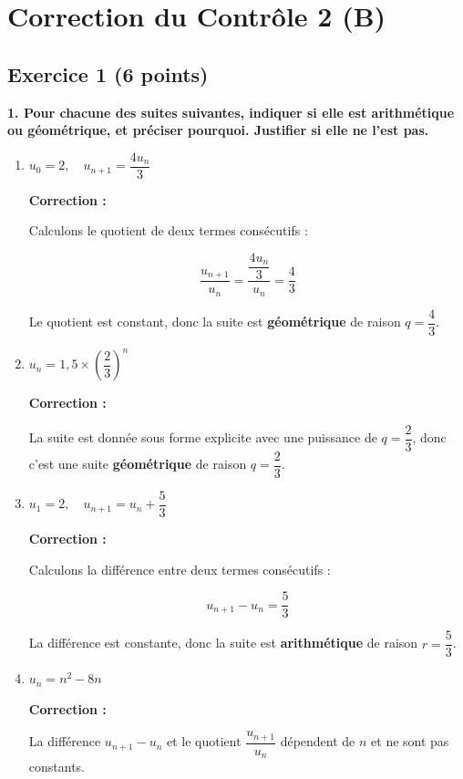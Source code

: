 \documentclass{article}
\begin{document}
\section*{Correction du Contrôle 2 (B)}

\subsection*{Exercice 1 (6 points)}

\textbf{1. Pour chacune des suites suivantes, indiquer si elle est arithmétique ou géométrique, et préciser pourquoi. Justifier si elle ne l'est pas.}

\begin{enumerate}[label=\alph*)]

\item \( u_0 = 2, \quad u_{n+1} = \dfrac{4 u_n}{3} \)

\textbf{Correction :}

Calculons le quotient de deux termes consécutifs :

\[ \dfrac{u_{n+1}}{u_n} = \dfrac{\dfrac{4 u_n}{3}}{u_n} = \dfrac{4}{3} \]

Le quotient est constant, donc la suite est \textbf{géométrique} de raison \( q = \dfrac{4}{3} \).

\bigskip

\item \( u_n = 1{,}5 \times \left( \dfrac{2}{3} \right)^n \)

\textbf{Correction :}

La suite est donnée sous forme explicite avec une puissance de \( q = \dfrac{2}{3} \), donc c'est une suite \textbf{géométrique} de raison \( q = \dfrac{2}{3} \).

\bigskip

\item \( u_1 = 2, \quad u_{n+1} = u_n + \dfrac{5}{3} \)

\textbf{Correction :}

Calculons la différence entre deux termes consécutifs :

\[ u_{n+1} - u_n = \dfrac{5}{3} \]

La différence est constante, donc la suite est \textbf{arithmétique} de raison \( r = \dfrac{5}{3} \).

\bigskip

\item \( u_n = n^2 - 8n \)

\textbf{Correction :}

La différence \( u_{n+1} - u_n \) et le quotient \( \dfrac{u_{n+1}}{u_n} \) dépendent de \( n \) et ne sont pas constants.


\end{enumerate}
\end{document}

